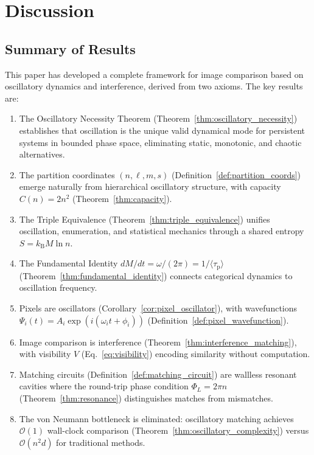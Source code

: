 \documentclass[11pt,twocolumn,a4paper]{article}
\newcommand{\kb}{k_{\mathrm{B}}}
\newcommand{\BigO}{\mathcal{O}}
\newcommand{\taup}{\tau_{\mathrm{p}}}
\begin{document}
\section{Discussion}\label{sec:discussion}

\subsection{Summary of Results}

This paper has developed a complete framework for image comparison based on oscillatory dynamics and interference, derived from two axioms. The key results are:

\begin{enumerate}[label=(\arabic*)]
    \item The Oscillatory Necessity Theorem (Theorem~\ref{thm:oscillatory_necessity}) establishes that oscillation is the unique valid dynamical mode for persistent systems in bounded phase space, eliminating static, monotonic, and chaotic alternatives.

    \item The partition coordinates $(n, \ell, m, s)$ (Definition~\ref{def:partition_coords}) emerge naturally from hierarchical oscillatory structure, with capacity $C(n) = 2n^2$ (Theorem~\ref{thm:capacity}).

    \item The Triple Equivalence (Theorem~\ref{thm:triple_equivalence}) unifies oscillation, enumeration, and statistical mechanics through a shared entropy $S = \kb M \ln n$.

    \item The Fundamental Identity $dM/dt = \omega/(2\pi) = 1/\langle\taup\rangle$ (Theorem~\ref{thm:fundamental_identity}) connects categorical dynamics to oscillation frequency.

    \item Pixels are oscillators (Corollary~\ref{cor:pixel_oscillator}), with wavefunctions $\Psi_i(t) = A_i \exp(i(\omega_i t + \phi_i))$ (Definition~\ref{def:pixel_wavefunction}).

    \item Image comparison is interference (Theorem~\ref{thm:interference_matching}), with visibility $V$ (Eq.~\eqref{eq:visibility}) encoding similarity without computation.

    \item Matching circuits (Definition~\ref{def:matching_circuit}) are wallless resonant cavities where the round-trip phase condition $\Phi_L = 2\pi n$ (Theorem~\ref{thm:resonance}) distinguishes matches from mismatches.

    \item The von Neumann bottleneck is eliminated: oscillatory matching achieves $\BigO(1)$ wall-clock comparison (Theorem~\ref{thm:oscillatory_complexity}) versus $\BigO(n^2 d)$ for traditional methods.
\end{enumerate}
\end{document}
